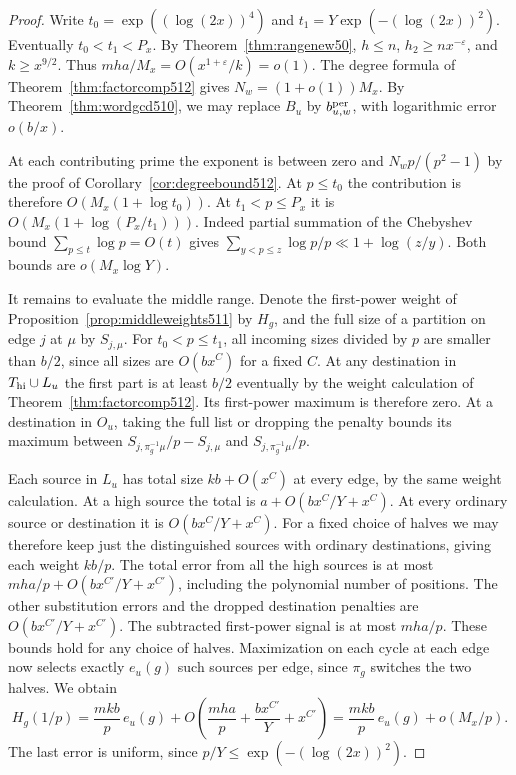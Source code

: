 \documentclass[a4paper,11pt]{article}
\theoremstyle{definition}
\theoremstyle{remark}
\numberwithin{equation}{section}
\begin{document}
\begin{proof}
Write \(t_0=\exp((\log(2x))^4)\) and
\(t_1=Y\exp(-(\log(2x))^2)\). Eventually \(t_0<t_1<P_x\).
By Theorem~\ref{thm:rangenew50}, \(h\le n\),
\(h_2\ge n x^{-\varepsilon}\), and \(k\ge x^{9/2}\).
Thus \(mha/M_x=O(x^{1+\varepsilon}/k)=o(1)\).
The degree formula of Theorem~\ref{thm:factorcomp512}
gives \(N_w=(1+o(1))M_x\). By Theorem~\ref{thm:wordgcd510},
we may replace \(B_u\) by \(b^{\rm per}_{u,w}\), with
logarithmic error \(o(b/x)\).

At each contributing prime the exponent is between zero
and \(N_w p/(p^2-1)\) by the proof of
Corollary~\ref{cor:degreebound512}. At \(p\le t_0\) the
contribution is therefore \(O(M_x(1+\log t_0))\). At
\(t_1<p\le P_x\) it is \(O(M_x(1+\log(P_x/t_1)))\).
Indeed partial summation of the Chebyshev bound
\(\sum_{p\le t}\log p=O(t)\) gives
\(\sum_{y<p\le z}\log p/p\ll 1+\log(z/y)\).
Both bounds are \(o(M_x\log Y)\).

It remains to evaluate the middle range. Denote the
first-power weight of Proposition~\ref{prop:middleweights511}
by \(H_g\), and the full size of a partition on edge \(j\) at
\(\mu\) by \(S_{j,\mu}\). For \(t_0<p\le t_1\), all incoming
sizes divided by \(p\) are smaller than \(b/2\), since all
sizes are \(O(bx^C)\) for a fixed \(C\).
At any destination in \(T_{\rm hi}\cup L_u\) the first part
is at least \(b/2\) eventually by the weight calculation of
Theorem~\ref{thm:factorcomp512}. Its first-power maximum is
therefore zero. At a destination in \(O_u\), taking the full
list or dropping the penalty bounds its maximum between
\(S_{j,\pi_g^{-1}\mu}/p-S_{j,\mu}\) and
\(S_{j,\pi_g^{-1}\mu}/p\).

Each source in \(L_u\) has total size \(k b+O(x^C)\) at every
edge, by the same weight calculation. At a high source the
total is \(a+O(bx^C/Y+x^C)\). At every ordinary source or
destination it is \(O(bx^C/Y+x^C)\). For a fixed choice of
halves we may therefore keep just the distinguished sources
with ordinary destinations, giving each weight \(kb/p\).
The total error from all the high sources is at most
\(mha/p+O(bx^{C'}/Y+x^{C'})\), including the polynomial
number of positions. The other substitution errors and the
dropped destination penalties are \(O(bx^{C'}/Y+x^{C'})\).
The subtracted first-power signal is at most \(mha/p\).
These bounds hold for any choice of halves. Maximization on
each cycle at each edge now selects exactly \(e_u(g)\) such
sources per edge, since \(\pi_g\) switches the two halves.
We obtain
\[
 H_g(1/p)=\frac{m k b}{p}\,e_u(g)
       +O\left(\frac{mha}{p}+\frac{b x^{C'}}{Y}+x^{C'}\right)
       =\frac{m k b}{p}\,e_u(g)+o(M_x/p).
\]
The last error is uniform, since \(p/Y\le\exp(-(\log(2x))^2)\).


\end{proof}
\end{document}
